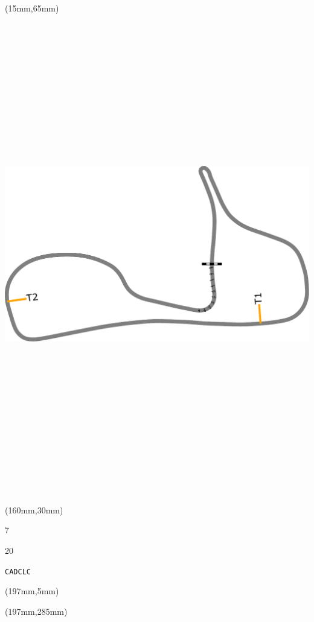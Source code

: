 \begin{textblock*}{185mm}(15mm,65mm)%
\centering
\mbox{\includegraphics[width=185mm,height=210mm,keepaspectratio]{PT/CADCLC.pdf}}
\end{textblock*}
\begin{textblock*}{40mm}(160mm,30mm)%
\Large
\par{} 
\par7 
\par20 
\par\hfill\tiny\tt CADCLC\\
\end{textblock*}
\begin{textblock*}{20mm}(197mm,5mm)%
\fbox{\thepage}
\label{CADCLC}
\end{textblock*}
\begin{textblock*}{20mm}(197mm,285mm)%
\fbox{\thepage}
\end{textblock*}

